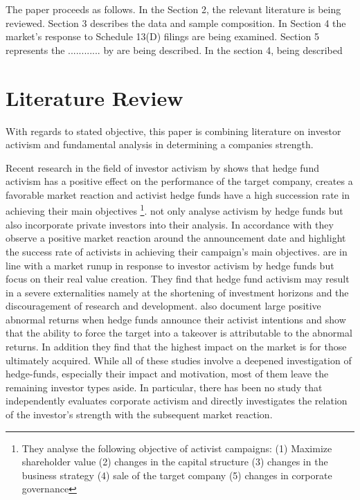 \documentclass[12pt]{article}
\begin{document}
The paper proceeds as follows. In the Section 2, the relevant literature is being reviewed. Section 3 describes the data and sample composition. In Section 4 the market's response to Schedule 13(D) filings are being examined. Section 5 represents the ............
by  are being described.  In the section 4, being described 



\section{Literature Review}

With regards to stated objective, this paper is combining literature on investor activism and fundamental analysis in determining a companies strength.

Recent research in the field of investor activism by \citet{Brav2008} shows that hedge fund activism has a positive effect on the performance of the target company, creates a favorable market reaction and activist hedge funds have a high succession rate in achieving their main objectives \footnote{They analyse the following objective of activist campaigns: (1) Maximize shareholder value (2) changes in the capital structure (3) changes in the business strategy (4) sale of the target company (5) changes in corporate governance}.
\citet{Klein2009} not only analyse activism by hedge funds but also incorporate private investors into their analysis. In accordance with \citet{Brav2008} they observe a positive market reaction around the announcement date and highlight the success rate of activists in achieving their campaign's main objectives.
\citet{CoffeeJr.2014} are in line with a market runup in response to investor activism by hedge funds but focus on their real value creation. They find that hedge fund activism may result in a severe externalities namely at the shortening of investment horizons and the discouragement of research and development. \citet{Greenwood2009} also document large positive abnormal returns when hedge funds announce their activist intentions and show that the ability to force the target into a takeover is attributable to the abnormal returns. In addition they find that the highest impact on the market is for those ultimately acquired.
While all of these studies involve a deepened investigation of hedge-funds, especially their impact and motivation, most of them leave the remaining investor types aside. In particular, there has been no study that independently evaluates corporate activism and directly investigates the relation of the investor's strength with the subsequent market reaction. 
\end{document}
